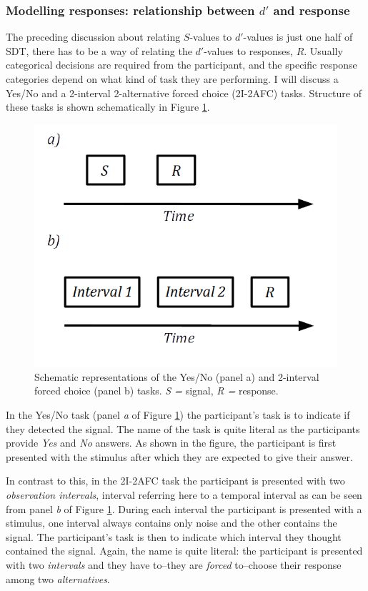 \documentclass{article}\usepackage{knitr}
\begin{document}
\subsubsection{Modelling responses: relationship between $d'$ and response}

The preceding discussion about relating $S$-values to $d'$-values is just one half of SDT, there has to be a way of relating the $d'$-values to responses, $R$. Usually categorical decisions are required from the participant, and the specific response categories depend on what kind of task they are performing. I will discuss a Yes/No and a 2-interval 2-alternative forced choice (2I-2AFC) tasks. Structure of these tasks is shown schematically in Figure \ref{fig:YesNoAfc}.

\begin{figure}[!htb]
\centering
\includegraphics[scale = 0.5]{YesNoAfc}
\caption{Schematic representations of the Yes/No (panel a) and 2-interval forced choice (panel b) tasks. \textit{S = } signal, \textit{R =} response.}
\label{fig:YesNoAfc}
\end{figure}

In the Yes/No task (panel \textit{a} of Figure \ref{fig:YesNoAfc}) the participant's task is to indicate if they detected the signal. The name of the task is quite literal as the participants provide \textit{Yes} and \textit{No} answers. As shown in the figure, the participant is first presented with the stimulus after which they are expected to give their answer.

In contrast to this, in the 2I-2AFC task the participant is presented with two \textit{observation intervals}, interval referring here to a temporal interval as can be seen from panel \textit{b} of Figure \ref{fig:YesNoAfc}. During each interval the participant is presented with a stimulus, one interval always contains only noise and the other contains the signal. The participant's task is then to indicate which interval they thought contained the signal. Again, the name is quite literal: the participant is presented with two \textit{intervals} and they have to--they are \textit{forced} to--choose their response among two \textit{alternatives}.
\end{document}
